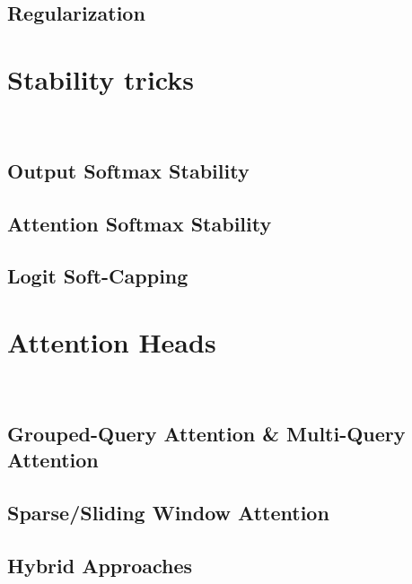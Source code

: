 \subsection{Regularization}



\clearpage
{\chaptoc\noindent\begin{minipage}[inner sep=0,outer sep=0]{0.9\linewidth}\section{Stability tricks}\end{minipage}}
\\

\subsection{Output Softmax Stability}

\subsection{Attention Softmax Stability}

\subsection{Logit Soft-Capping}



\clearpage
{\chaptoc\noindent\begin{minipage}[inner sep=0,outer sep=0]{0.9\linewidth}\section{Attention Heads}\end{minipage}}
\\

\subsection{Grouped-Query Attention \& Multi-Query Attention}

\subsection{Sparse/Sliding Window Attention}

\subsection{Hybrid Approaches}





